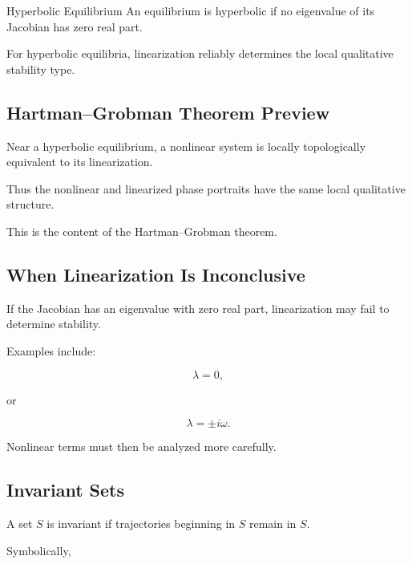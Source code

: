 \begin{definitionbox}{Hyperbolic Equilibrium}
An equilibrium is hyperbolic if no eigenvalue of its Jacobian has zero
real part.
\end{definitionbox}

For hyperbolic equilibria, linearization reliably determines the local
qualitative stability type.

\subsection{Hartman--Grobman Theorem Preview}
\label{subsec:hartman-grobman-preview}

Near a hyperbolic equilibrium, a nonlinear system is locally
topologically equivalent to its linearization.

Thus the nonlinear and linearized phase portraits have the same local
qualitative structure.

This is the content of the Hartman--Grobman theorem.

\subsection{When Linearization Is Inconclusive}
\label{subsec:linearization-inconclusive}

If the Jacobian has an eigenvalue with zero real part, linearization may
fail to determine stability.

Examples include:

\[
\boxed{
\lambda=0,
}
\]

or

\[
\boxed{
\lambda=\pm i\omega.
}
\]

Nonlinear terms must then be analyzed more carefully.

\subsection{Invariant Sets}
\label{subsec:invariant-sets}

A set \(S\) is invariant if trajectories beginning in \(S\) remain in
\(S\).

Symbolically,

